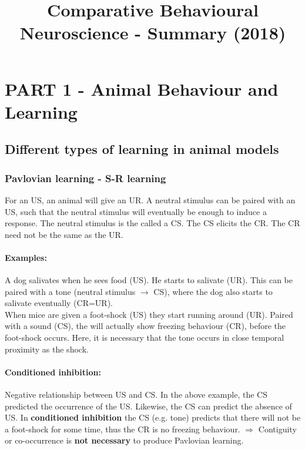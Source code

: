 \documentclass[twosided, a4paper, pt11]{article}
\begin{document}
	\title{Comparative Behavioural Neuroscience - Summary (2018)}
	
	\maketitle
	
	\tableofcontents
	\newpage
	
	\section{PART 1 - Animal Behaviour and Learning}
	
	\subsection{Different types of learning in animal models}
	\subsubsection{Pavlovian learning - S-R learning}
	For an US, an animal will give an UR. A neutral stimulus can be paired with an US, such that the neutral stimulus will eventually be enough to induce a response. The neutral stimulus is the called a CS. The CS elicits the CR. The CR need not be the same as the UR.
	\paragraph{Examples:} A dog salivates when he sees food (US). He starts to salivate (UR). This can be paired with a tone (neutral stimulus $\rightarrow$ CS), where the dog also starts to salivate eventually (CR=UR).\\
	When mice are given a foot-shock (US) they start running around (UR). Paired with a sound (CS), the will actually show freezing behaviour (CR), before the foot-shock occurs. Here, it is necessary that the tone occurs in close temporal proximity as the shock.
	\paragraph{Conditioned inhibition:} Negative relationship between US and CS. In the above example, the CS predicted the occurrence of the US. Likewise, the CS can predict the absence of US. In \textbf{conditioned inhibition} the CS (e.g. tone) predicts that there will not be a foot-shock for some time, thus the CR is no freezing behaviour.
	$\Rightarrow$ Contiguity or co-occurrence is \textbf{not necessary} to produce Pavlovian learning.
	
\end{document}

